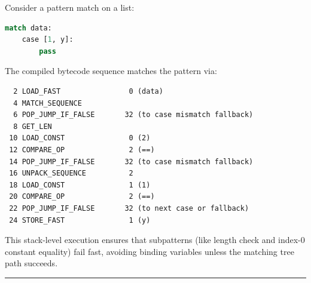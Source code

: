 Consider a pattern match on a list:

\begin{lstlisting}[language=Python]
match data:
    case [1, y]:
        pass
\end{lstlisting}

The compiled bytecode sequence matches the pattern via:

\begin{lstlisting}
  2 LOAD_FAST                0 (data)
  4 MATCH_SEQUENCE
  6 POP_JUMP_IF_FALSE       32 (to case mismatch fallback)
  8 GET_LEN
 10 LOAD_CONST               0 (2)
 12 COMPARE_OP               2 (==)
 14 POP_JUMP_IF_FALSE       32 (to case mismatch fallback)
 16 UNPACK_SEQUENCE          2
 18 LOAD_CONST               1 (1)
 20 COMPARE_OP               2 (==)
 22 POP_JUMP_IF_FALSE       32 (to next case or fallback)
 24 STORE_FAST               1 (y)
\end{lstlisting}

This stack-level execution ensures that subpatterns (like length check
and index-0 constant equality) fail fast, avoiding binding variables
unless the matching tree path succeeds.

\begin{center}\rule{0.5\linewidth}{0.5pt}\end{center}
